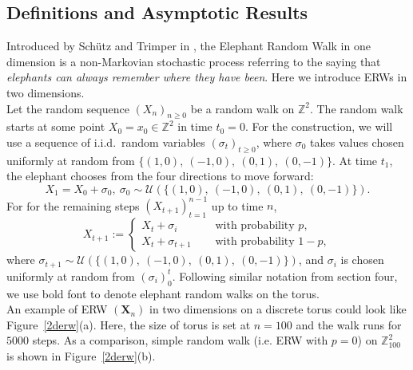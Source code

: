 \documentclass[
11pt, %
a4paper, %
oneside, %
headinclude,footinclude, %
BCOR5mm, %
]{scrartcl}
\begin{document}
\subsection{Definitions and Asymptotic Results}
Introduced by Schütz and Trimper in \cite{schutz2004elephants}, the Elephant Random Walk in one dimension is a non-Markovian stochastic process referring to the saying that \textit{elephants can always remember where they have been}. Here we introduce ERWs in two dimensions. 
\vspace{0.6em}\\Let the random sequence $(X_n)_{n \geq 0}$ be a random walk on $\mathbb{Z}^2$. The random walk starts at some point $X_0 = x_0 \in \mathbb{Z}^2$ in time $t_0 = 0$. For the construction, we will use a sequence of i.i.d.~random variables $(\sigma_{t})_{t \geq 0}$, where  $\sigma_0$ takes values chosen uniformly at random from $\{(1,0), \ (-1,0), \ (0,1), \ (0,-1) \}$. At time $t_1$, the elephant chooses from the four directions to move forward: 
\begin{equation}
    X_1 = X_0 + \sigma_0, \ \sigma_0 \sim \mathscr{U}(\{(1,0), \ (-1,0), \ (0,1), \ (0,-1)\}). \tag{5.1}
\end{equation}    
For for the remaining steps $\left(X_{t+1}\right)_{t=1}^{n-1}$ up to time $n$, 
\begin{equation}
    X_{t+1}:=\left\{
\begin{aligned}
X_t + \sigma_i \quad &\text{ with probability } p,\\
X_t + \sigma_{t+1} \quad& \text{ with probability } 1-p,
\end{aligned}
\right.\tag{5.2}
\end{equation}
where $\sigma_{t+1} \sim \mathscr{U}(\{(1,0), \ (-1,0), \ (0,1), \ (0,-1)\})$, and $\sigma_i$ is chosen uniformly at random from $(\sigma_i)_0^t$. Following similar notation from section four, we use bold font to denote elephant random walks on the torus. 
\vspace{0.6em}\\An example of ERW $(\mathbf{X}_n)$ in two dimensions on a  discrete torus could look like Figure~\ref{2derw}(a). Here, the size of torus is set at $n=100$ and the walk runs for $5000$ steps. As a comparison, simple random walk (i.e. ERW with $p=0$) on $\mathbb{Z}^2_{100}$ is shown in Figure~\ref{2derw}(b).
\end{document}
